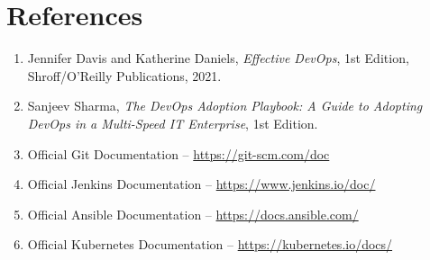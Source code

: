 \documentclass[12pt,a4paper]{article}
\begin{document}
\section*{References}

\begin{enumerate}[nosep]
    \item Jennifer Davis and Katherine Daniels, \textit{Effective DevOps}, 1st Edition, Shroff/O'Reilly Publications, 2021.
    \item Sanjeev Sharma, \textit{The DevOps Adoption Playbook: A Guide to Adopting DevOps in a Multi-Speed IT Enterprise}, 1st Edition.
    \item Official Git Documentation -- \url{https://git-scm.com/doc}
    \item Official Jenkins Documentation -- \url{https://www.jenkins.io/doc/}
    \item Official Ansible Documentation -- \url{https://docs.ansible.com/}
    \item Official Kubernetes Documentation -- \url{https://kubernetes.io/docs/}
\end{enumerate}
\end{document}
